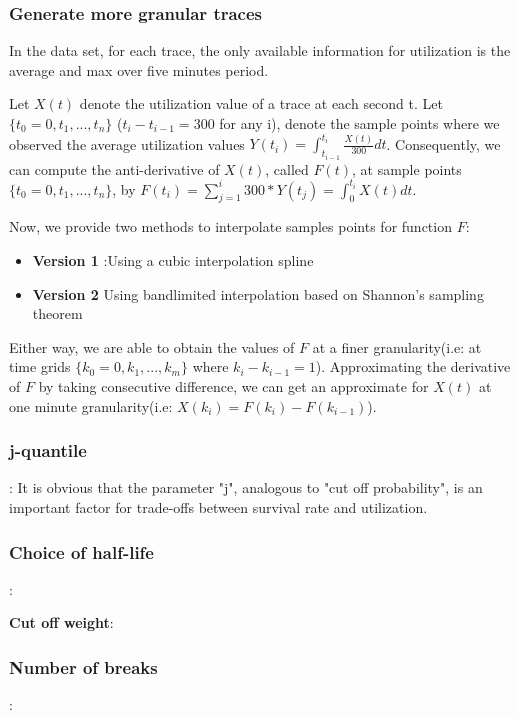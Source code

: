 \documentclass{article}
\begin{document}
\subsubsection{Generate more granular traces}

\begin{flushleft}
In the data set, for each trace, the only available information for utilization is the average and max over five minutes period. 

Let $X(t)$ denote the utilization value of a trace at each second t. Let $\{t_0 = 0,t_1,...,t_n\}$ ($t_i - t_{i-1} = 300$ for any i), denote the sample points where we observed the average utilization values $Y(t_i) = \int_{t_{i-1}}^{t_i}\frac{X(t)}{300}dt$. Consequently, we can compute the anti-derivative of $X(t)$, called $F(t)$, at sample points $\{t_0 = 0,t_1,...,t_n\}$, by $F(t_i) = \sum_{j=1}^{i} 300 * Y(t_j) = \int_{0}^{t_i}X(t)dt$. 

Now, we provide two methods to interpolate samples points for function $F$:
\begin{itemize}
    \item \textbf{Version 1} :Using a cubic interpolation spline
    \item \textbf{Version 2} Using bandlimited interpolation based on Shannon's sampling theorem
\end{itemize}
Either way, we are able to obtain the values of $F$ at a finer granularity(i.e: at time grids $\{k_0 = 0, k_1, ..., k_m\}$ where $k_i - k_{i-1} = 1$). Approximating the derivative of $F$ by taking consecutive difference, we can get an approximate for $X(t)$ at one minute granularity(i.e: $X(k_i) = F(k_i) - F(k_{i-1})$).    
\end{flushleft}

\subsubsection{j-quantile}:
It is obvious that the parameter "j", analogous to "cut off probability", is an important factor for trade-offs between survival rate and utilization.

\subsubsection{Choice of half-life}:

\textbf{Cut off weight}:

\subsubsection{Number of breaks}:
\end{document}
